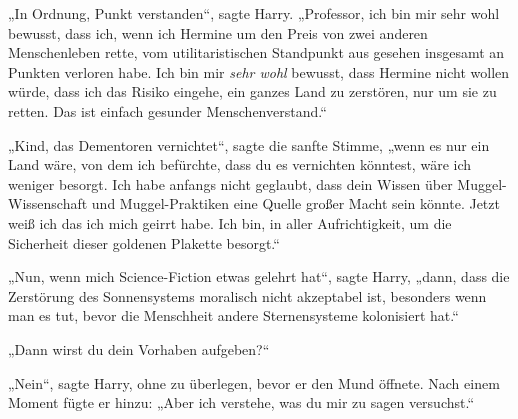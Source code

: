 „In Ordnung, Punkt verstanden“, sagte Harry. „Professor, ich bin mir sehr wohl bewusst, dass ich, wenn ich Hermine um den Preis von zwei anderen Menschenleben rette, vom utilitaristischen Standpunkt aus gesehen insgesamt an Punkten verloren habe. Ich bin mir \emph{sehr wohl} bewusst, dass Hermine nicht wollen würde, dass ich das Risiko eingehe, ein ganzes Land zu zerstören, nur um sie zu retten. Das ist einfach gesunder Menschenverstand.“

„Kind, das Dementoren vernichtet“, sagte die sanfte Stimme, „wenn es nur ein Land wäre, von dem ich befürchte, dass du es vernichten könntest, wäre ich weniger besorgt. Ich habe anfangs nicht geglaubt, dass dein Wissen über Muggel-Wissenschaft und Muggel-Praktiken eine Quelle großer Macht sein könnte. Jetzt weiß ich das ich mich geirrt habe. Ich bin, in aller Aufrichtigkeit, um die Sicherheit dieser goldenen Plakette besorgt.“

„Nun, wenn mich Science-Fiction etwas gelehrt hat“, sagte Harry, „dann, dass die Zerstörung des Sonnensystems moralisch nicht akzeptabel ist, besonders wenn man es tut, bevor die Menschheit andere Sternensysteme kolonisiert hat.“

„Dann wirst du dein Vorhaben aufgeben?“

„Nein“, sagte Harry, ohne zu überlegen, bevor er den Mund öffnete. Nach einem Moment fügte er hinzu: „Aber ich verstehe, was du mir zu sagen versuchst.“


